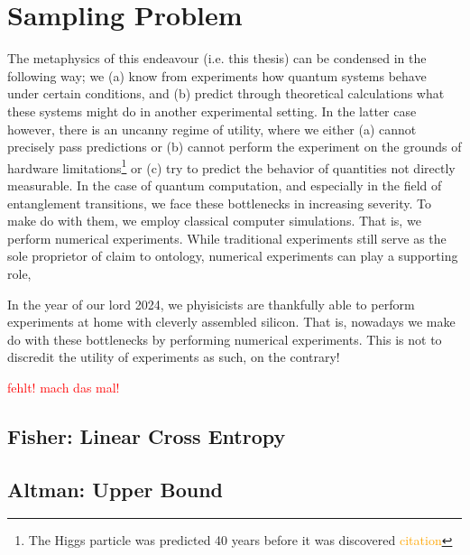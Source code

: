 \section{Sampling Problem}\label{sec:sampling}

The metaphysics of this endeavour (i.e. this thesis) can
be condensed in the following way; we (a) know from experiments how quantum
systems behave under certain conditions, and (b) predict through theoretical
calculations what these systems might do in another experimental setting. In
the latter case however, there is an uncanny regime of utility, where we either
(a) cannot precisely pass predictions or (b) cannot perform the experiment on
the grounds of hardware limitations\footnote{The Higgs particle was predicted
40 years before it was discovered \textcolor{orange}{citation}} or (c) try to
predict the behavior of quantities not directly measurable. In the case of
quantum computation, and especially in the field of entanglement transitions,
we face these bottlenecks in increasing severity. To make do with them, we
employ classical computer simulations. That is, we perform numerical
experiments. While traditional experiments still serve as the sole proprietor of claim to
ontology, numerical experiments can play a supporting role, 

In the year of our
lord 2024, we phyisicists are thankfully able to perform experiments at home
with cleverly assembled silicon.  That is, nowadays we make do with these
bottlenecks by performing numerical experiments. This is not to discredit the
utility of experiments as such, on the contrary! 

\textcolor{red}{fehlt! mach das mal!}

\subsection{Fisher: Linear Cross Entropy}
\cite{liCrossEntropyBenchmark2023}

\subsection{Altman: Upper Bound}
\cite{garrattProbingPostmeasurementEntanglement2023}
